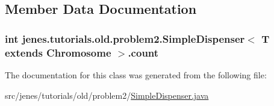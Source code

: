 \subsection{Member Data Documentation}
\hypertarget{classjenes_1_1tutorials_1_1old_1_1problem2_1_1_simple_dispenser_3_01_t_01extends_01_chromosome_01_4_a5182803fa079af07b76c2e69f6af1cd6}{
\subsubsection[{count}]{\setlength{\rightskip}{0pt plus 5cm}int jenes.\-tutorials.\-old.\-problem2.\-Simple\-Dispenser$<$ T extends Chromosome $>$.count\hspace{0.3cm}{\ttfamily [private]}}}\label{classjenes_1_1tutorials_1_1old_1_1problem2_1_1_simple_dispenser_3_01_t_01extends_01_chromosome_01_4_a5182803fa079af07b76c2e69f6af1cd6}


The documentation for this class was generated from the following file\-:\begin{DoxyCompactItemize}
\item 
src/jenes/tutorials/old/problem2/\hyperlink{old_2problem2_2_simple_dispenser_8java}{Simple\-Dispenser.\-java}\end{DoxyCompactItemize}
